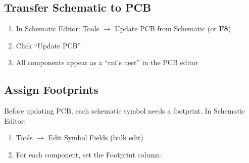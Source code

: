 \documentclass[a4paper,11pt]{article}
\renewcommand*{\,}{ }%
\begin{document}
\subsection{Transfer Schematic to PCB}

\begin{enumerate}
    \item In Schematic Editor: Tools $\rightarrow$ Update PCB from Schematic (or \textbf{F8})
    \item Click ``Update PCB''
    \item All components appear as a ``rat's nest'' in the PCB editor
\end{enumerate}

\subsection{Assign Footprints}

Before updating PCB, each schematic symbol needs a footprint. In Schematic Editor:

\begin{enumerate}
    \item Tools $\rightarrow$ Edit Symbol Fields (bulk edit)
    \item For each component, set the Footprint column:
\end{enumerate}
\end{document}

